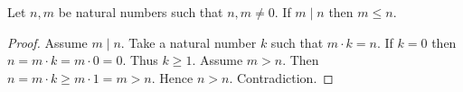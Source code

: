 \documentclass[10pt]{article}
\begin{document}
  \begin{forthel}
    \begin{proposition}
      Let $n, m$ be natural numbers such that $n, m \neq 0$.
      If $m \mid n$ then $m \leq n$.
    \end{proposition}
    \begin{proof}
      Assume $m \mid n$.
      Take a natural number $k$ such that $m \cdot k = n$.
      If $k = 0$ then
      $n
        = m \cdot k
        = m \cdot 0
        = 0$.
      Thus $k \geq 1$.
      Assume $m > n$.
      Then $n
        = m \cdot k
        \geq m \cdot 1
        = m
        > n$.
      Hence $n > n$.
      Contradiction.
    \end{proof}
  \end{forthel}
\end{document}
